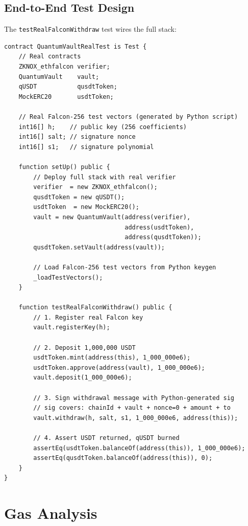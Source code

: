 \documentclass[11pt,a4paper]{article}
\begin{document}
\subsection{End-to-End Test Design}

The \texttt{testRealFalconWithdraw} test wires the full stack:

\begin{lstlisting}[style=solidity, caption={QuantumVaultReal.t.sol structure (simplified)}]
contract QuantumVaultRealTest is Test {
    // Real contracts
    ZKNOX_ethfalcon verifier;
    QuantumVault    vault;
    qUSDT           qusdtToken;
    MockERC20       usdtToken;

    // Real Falcon-256 test vectors (generated by Python script)
    int16[] h;    // public key (256 coefficients)
    int16[] salt; // signature nonce
    int16[] s1;   // signature polynomial

    function setUp() public {
        // Deploy full stack with real verifier
        verifier  = new ZKNOX_ethfalcon();
        qusdtToken = new qUSDT();
        usdtToken  = new MockERC20();
        vault = new QuantumVault(address(verifier),
                                 address(usdtToken),
                                 address(qusdtToken));
        qusdtToken.setVault(address(vault));

        // Load Falcon-256 test vectors from Python keygen
        _loadTestVectors();
    }

    function testRealFalconWithdraw() public {
        // 1. Register real Falcon key
        vault.registerKey(h);

        // 2. Deposit 1,000,000 USDT
        usdtToken.mint(address(this), 1_000_000e6);
        usdtToken.approve(address(vault), 1_000_000e6);
        vault.deposit(1_000_000e6);

        // 3. Sign withdrawal message with Python-generated sig
        // sig covers: chainId + vault + nonce=0 + amount + to
        vault.withdraw(h, salt, s1, 1_000_000e6, address(this));

        // 4. Assert USDT returned, qUSDT burned
        assertEq(usdtToken.balanceOf(address(this)), 1_000_000e6);
        assertEq(qusdtToken.balanceOf(address(this)), 0);
    }
}
\end{lstlisting}

\newpage
\section{Gas Analysis}
\end{document}
